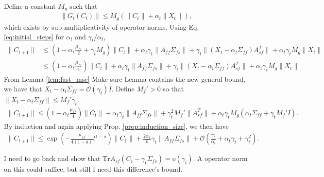 Define a constant $M_g$ such that
\begin{align*}
    \lVert G_t (C_t) \rVert \leq M_g \left(\lVert C_t \rVert + \alpha_t \lVert X_t \rVert\right) ,
\end{align*}
which exists by sub-multiplicativity of operator norms. 
Using Eq. \eqref{eq:initial_steps} for $\alpha_t$ and $\gamma_t/\alpha_t$,
\begin{align*}
    \lVert C_{t+1} \rVert 
    &\leq \left(1 - \alpha_t \frac{\mu_{ff}}{2} + \gamma_t M_g\right) \lVert C_t \rVert 
    + \alpha_t \gamma_t \lVert A_{ff} \Sigma_{fs} \rVert 
    + \gamma_t \lVert (X_t - \alpha_t \Sigma_{ff}) A_{sf}^T \rVert 
    + \alpha_t \gamma_t M_g \lVert X_t \rVert 
    \\ & 
    \leq 
    \left(1 - \alpha_t \frac{\mu_{ff}}{4}\right) \lVert C_t \rVert 
    + \alpha_t \gamma_t \lVert A_{ff} \Sigma_{fs} \rVert 
    + \gamma_t \lVert (X_t - \alpha_t \Sigma_{ff}) A_{sf}^T \rVert     
    + \alpha_t \gamma_t M_g \lVert X_t \rVert 
\end{align*}
From Lemma \ref{lem:fast_mse} {\color{red}Make sure Lemma contains the new general bound}, we have that $X_t - \alpha_t \Sigma_{ff} = \mathcal{O}(\gamma_t) I$. 
Define $M_f' > 0$ so that $\lVert X_t - \alpha_t \Sigma_{ff} \rVert \leq M_f' \gamma_t$.
\begin{align*}
    \lVert C_{t+1} \rVert 
    \leq 
    \left(1 - \alpha_t \frac{\mu_{ff}}{4}\right) \lVert C_t \rVert 
    + \alpha_t \gamma_t \lVert A_{ff} \Sigma_{fs} \rVert 
    + \gamma_t^2 M_f' \lVert A_{sf}^T \rVert     
    + \alpha_t \gamma_t M_g (\alpha_t \Sigma_{ff} + \gamma_t M_f' I)  .
\end{align*}
By induction and again applying Prop. \ref{prop:induction_size}, we then have
\begin{align*}
    \lVert C_{t+1} \rVert \leq \exp \left(- \frac{\mu_{ff}}{4 (1-a)} t^{1-a}\right) \lVert C_1 \rVert 
    + \frac{2 \alpha_1}{b} \gamma_t \lVert A_{ff} \Sigma_{fs} \rVert 
    + \mathcal{O}\left(\frac{\gamma_t^2}{\alpha_t} + \alpha_t \gamma_t + \gamma_t^2 \right) .
\end{align*}

{\color{red}I need to go back and show that $\mathrm{Tr} A_{sf} (C_t - \gamma_t \Sigma_{fs}) = o(\gamma_t)$.
A operator norm on this could suffice, but still I need this difference's bound. 
}